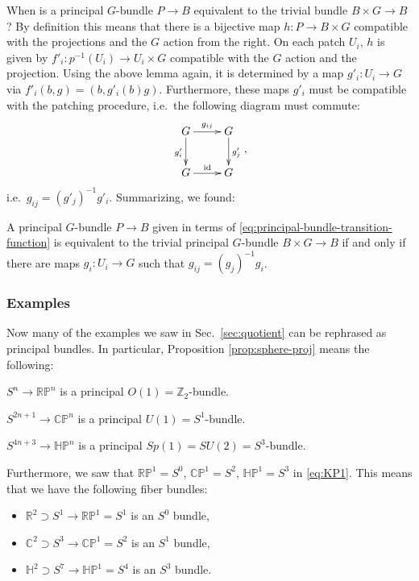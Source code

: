 \documentclass[12pt]{article}
\numberwithin{equation}{section}
\theoremstyle{remark}
\def\bC{\mathbb{C}}
\def\bH{\mathbb{H}}
\def\bR{\mathbb{R}}
\def\bZ{\mathbb{Z}}
\def\RP{\mathbb{RP}}
\def\CP{\mathbb{CP}}
\def\HP{\mathbb{HP}}
\begin{document}
When is a principal $G$-bundle $P\to B$ equivalent to the trivial bundle $B\times G \to B$?
By definition this means that there is a bijective map $h: P\to B\times G$
compatible with the projections and the $G$ action from the right.
On each patch $U_i$, $h$ is given by $f'_i: p^{-1}(U_i)\to U_i\times G$
compatible with the $G$ action and the projection.
Using the above lemma again,
it is determined by a map $g'_i: U_i\to G$ via $f'_i(b,g)=(b,g'_i(b)g)$.
Furthermore, these maps $g'_i$ must be compatible with the patching procedure, i.e.~the following diagram must commute:
\begin{equation}
\vcenter{\xymatrix{
  G \ar[r]^{g_{ij}} \ar[d]_{g'_i} & G \ar[d]^{g'_j} \\
  G \ar[r]^{\text{id}} & G 
}},
\end{equation}
i.e.~$g_{ij} = (g'_j)^{-1} g'_i$.
Summarizing, we found: 
\begin{proposition}
  A principal $G$-bundle $P\to B$
  given in terms of \eqref{eq:principal-bundle-transition-function}
  is equivalent to the trivial principal $G$-bundle $B\times G \to B$
  if and only if there are maps $g_i: U_i\to G$ such that $g_{ij} = (g_j)^{-1} g_i$.
\end{proposition}

\subsubsection{Examples}

Now many of the examples we saw in Sec.~\ref{sec:quotient} can be rephrased as principal bundles.
In particular, Proposition \eqref{prop:sphere-proj} means the following:
\begin{example}
  \label{ex:RPn}
$S^n\to \RP^n$ is a principal $O(1)=\bZ_2$-bundle.
\end{example}

\begin{example}
  \label{ex:CPn}
$S^{2n+1}\to \CP^n$ is a principal $U(1)=S^1$-bundle.
\end{example}

\begin{example}
  \label{ex:HPn}
  $S^{4n+3}\to \HP^n$ is a principal $Sp(1)=SU(2)=S^3$-bundle.
\end{example}

Furthermore, we saw that $\RP^1=S^0$, $\CP^1=S^2$, $\HP^1=S^3$ 
in \eqref{eq:KP1}. 
This means that we have the following fiber bundles:
\begin{itemize}
  \item $\bR^2\supset S^1\to \RP^1=S^1$  is an $S^0$ bundle,
  \item $\bC^2\supset S^3\to \CP^1=S^2$ is an $S^1$ bundle,
  \item $\bH^2\supset S^7\to \HP^1=S^4$ is an $S^3$ bundle.
\end{itemize}
\end{document}
